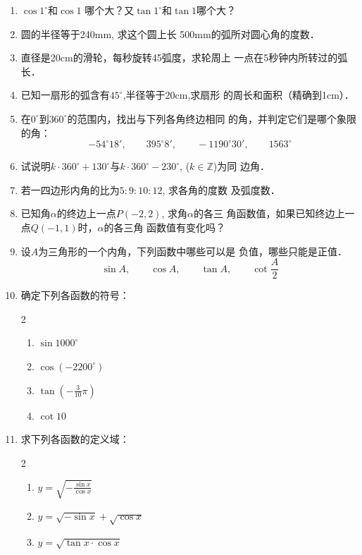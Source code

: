 \begin{enumerate}

    
    \item    $\cos1^{\circ}$和$\cos1$
    哪个大？又$\tan1^{\circ}$和$\tan 1$哪个大？
    \item 圆的半径等于240mm, 求这个圆上长
    500mm的弧所对圆心角的度数．
    \item 直径是20cm的滑轮，每秒旋转45弧度，求轮周上
    一点在5秒钟内所转过的弧长．
    \item 已知一扇形的弧含有$45^{\circ}$,半径等于20cm,求扇形
    的周长和面积（精确到1cm）．
    \item 在$0^{\circ}$到$360^{\circ}$的范围内，找出与下列各角终边相同
    的角，并判定它们是哪个象限的角：
\[-54^{\circ}18',\qquad 395^{\circ}8',\qquad -1190^{\circ}30',\qquad 1563^{\circ}\]

\item 试说明$k\cdot 360^{\circ}+130^{\circ}$与$k\cdot 360^{\circ}-230^{\circ}$, ($k\in\mathbb{Z}$)为同
边角．
\item 若一四边形内角的比为$5:9:10:12$, 求各角的度数
及弧度数．
\item 已知角$\alpha$的终边上一点$P(-2,2)$, 求角$\alpha$的各三
角函数值，如果已知终边上一点$Q(-1,1)$时，$\alpha$的各三角
函数值有变化吗？
\item 设$A$为三角形的一个内角，下列函数中哪些可以是
负值，哪些只能是正值．
\[\sin A,\qquad \cos A,\qquad \tan A,\qquad \cot\frac{A}{2}\]
\item 确定下列各函数的符号：
\begin{multicols}{2}
\begin{enumerate}
    \item $\sin1000^{\circ}$
    \item $\cos(-2200^{\circ})$
    \item $\tan\left(-\frac{3}{10}\pi\right)$
    \item $\cot 10$
\end{enumerate}
\end{multicols}

\item 求下列各函数的定义域：
\begin{multicols}{2}
    \begin{enumerate}
        \item $y=\sqrt{-\frac{\sin x}{\cos x}}$
        \item $y=\sqrt{-\sin x}+\sqrt{\cos x}$
        \item $y=\sqrt{\tan x\cdot \cos x}$
    \end{enumerate}
    \end{multicols}


\end{enumerate}
